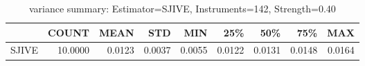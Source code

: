 \begin{table}[ht]
\centering
\caption{variance summary: Estimator=SJIVE, Instruments=142, Strength=0.40}
\begin{tabular}{lrrrrrrrr}
\toprule
 & COUNT & MEAN & STD & MIN & 25\% & 50\% & 75\% & MAX \\
\midrule
SJIVE & 10.0000 & 0.0123 & 0.0037 & 0.0055 & 0.0122 & 0.0131 & 0.0148 & 0.0164 \\
\bottomrule
\end{tabular}
\end{table}
